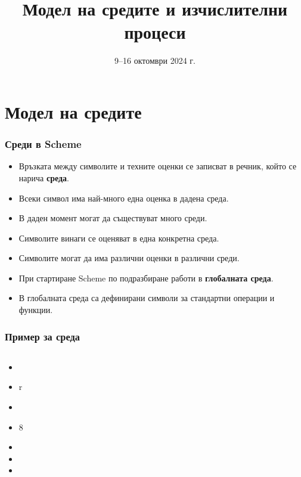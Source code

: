 \documentclass[alsotrans,beameroptions={aspectratio=169}]{beamerswitch}
\title[Среди и процеси]{Модел на средите и изчислителни процеси}
\date{9--16 октомври 2024 г.}
\begin{document}
\begin{frame}
  \titlepage
\end{frame}

\section{Модел на средите}

\begin{frame}
  \frametitle{Среди в Scheme}

  \begin{itemize}[<+->]
  \item Връзката между символите и техните оценки се записват в речник, който се нарича \textbf{среда}.
  \item Всеки символ има най-много една оценка в дадена среда.
  \item В даден момент могат да съществуват много среди.
  \item Символите винаги се оценяват в една конкретна среда.
  \item \alert{Символите могат да има различни оценки в различни среди.}
  \item При стартиране Scheme по подразбиране работи в \textbf{глобалната среда}.
  \item В глобалната среда са дефинирани символи за стандартни операции и функции.
  \end{itemize}
\end{frame}

\begin{frame}
  \frametitle{Пример за среда}

  \begin{columns}[T,onlytextwidth]
    \begin{column}{.5\textwidth}
      \begin{itemize}[<+->]
      \item {}
      \item \evalstoerr r
      \item {}
      \item {}8
      \item {}
      \item {}
      \item {}
      \end{itemize}
    \end{column}

    \begin{column}{.5\textwidth}
    \end{column}
  \end{columns}
\end{frame}
\end{document}
